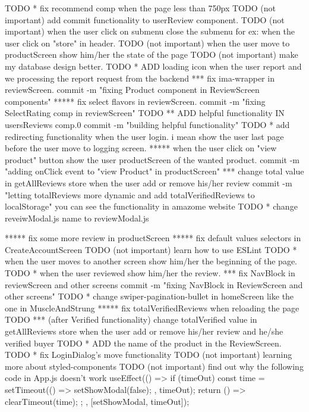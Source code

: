 {TODO * fix recommend comp when the page less than 750px
TODO (not important) add commit functionality to userReview component.
TODO (not important) when the user click on submenu close the submenu for ex: when the user click on "store" in header.
TODO (not important) when the user move to productScreen show him/her the state of the page
TODO (not important) make my database design better.
TODO * ADD loading icon when the user report and we processing the report request from the backend
*** fix ima-wrapper in reviewScreen.
    commit -m "fixing Product component in ReviewScreen components"
***** fix select flavors in reviewScreen.
    commit -m "fixing SelectRating comp in reviewScreen"
TODO ** ADD helpful functionality IN usersReviews comp.0
        commit -m "building helpful functionality"
TODO * add redirecting functionality when the user login. i mean show the user last page before the user move to logging screen.
***** when the user click on "view product" button show the user productScreen of the wanted product.
      commit -m "adding onClick event to "view Product" in productScreen"
*** change total value in getAllReviews store when the user add or remove his/her review
    commit -m "letting totalReviews more dynamic and add totalVerifiedReviews to localStorage"
      you can see the functionality in amazome website
TODO * change reveiwModal.js name to reviewModal.js

***** fix some more review in productScreen
***** fix default values selectors in CreateAccountScreen 
TODO (not important) learn how to use ESLint
TODO * when the user moves to another screen show him/her the beginning of the page.
TODO * when the user reviewed show him/her the review.
*** fix NavBlock in reviewScreen and other screens
      commit -m "fixing NavBlock in ReviewScreen and other screens"
TODO * change swiper-pagination-bullet in homeScreen like the one in MuscleAndStrung
***** fix totalVerifiedReviews when reloading the page
TODO *** (after Verified functionality) change totalVerified value in getAllReviews store when the user add or remove his/her review and he/she verified buyer
TODO * ADD the name of the product in the ReviewScreen.
TODO * fix  LoginDialog's move functionality 
TODO (not important) learning more about styled-components
TODO (not important) find out why the following code in App.js doesn't work
     useEffect(() => {
    if (timeOut) {
      const time = setTimeout(() => {
        setShowModal(false);
      }, timeOut);
      return () => {
        clearTimeout(time);
      };
    }
  }, [setShowModal, timeOut]);

}
